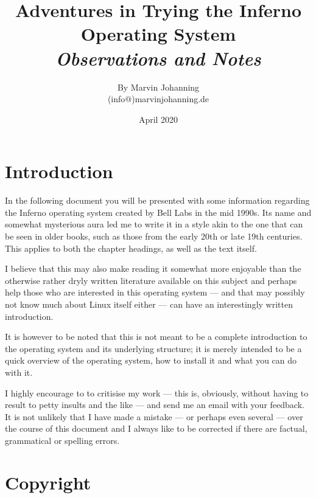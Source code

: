 \documentclass[a4paper,12pt]{report}
\begin{document}

\title{%
  Adventures in Trying the Inferno Operating System \\
  \textit{Observations and Notes}
}
\author{By Marvin Johanning\\(info@)marvinjohanning.de}
\date{April 2020}
\maketitle
\pagebreak

\tableofcontents
\pagebreak


\chapter*{Introduction}
In the following document you will be presented with some information regarding the Inferno operating system created by Bell Labs in the mid 1990s. Its name and somewhat mysterious aura led me to write it in a style akin to the one that can be seen in older books, such as those from the early 20th or late 19th centuries. This applies to both the chapter headings, as well as the text itself.

I believe that this may also make reading it somewhat more enjoyable than the otherwise rather dryly written literature available on this subject and perhaps help those who are interested in this operating system — and that may possibly not know much about Linux itself either — can have an interestingly written introduction.

It is however to be noted that this is not meant to be a complete introduction to the operating system and its underlying structure; it is merely intended to be a quick overview of the operating system, how to install it and what you can do with it.

I highly encourage to to critisise my work — this is, obviously, without having to result to petty insults and the like — and send me an email with your feedback. It is not unlikely that I have made a mistake — or perhaps even several — over the course of this document and I always like to be corrected if there are factual, grammatical or spelling errors.
\pagebreak


\chapter*{Copyright}
\end{document}
